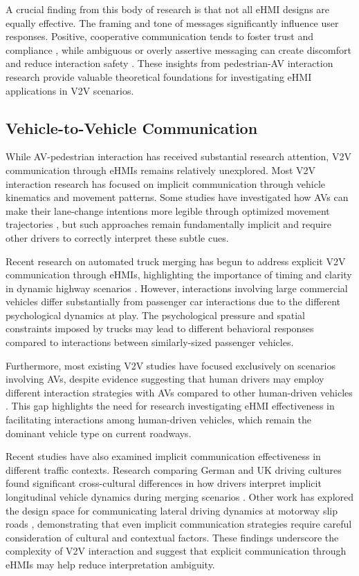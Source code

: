 \documentclass[manuscript,review]{acmart}
\begin{document}
A crucial finding from this body of research is that not all eHMI designs are equally effective. The framing and tone of messages significantly influence user responses. Positive, cooperative communication tends to foster trust and compliance \cite{ackermann2019deceleration, bengler2020hmi, deb2020communicating}, while ambiguous or overly assertive messaging can create discomfort and reduce interaction safety \cite{ames2017interpersonal, she2021shaping}. These insights from pedestrian-AV interaction research provide valuable theoretical foundations for investigating eHMI applications in V2V scenarios.

\subsection{Vehicle-to-Vehicle Communication}

While AV-pedestrian interaction has received substantial research attention, V2V communication through eHMIs remains relatively unexplored. Most V2V interaction research has focused on implicit communication through vehicle kinematics and movement patterns. Some studies have investigated how AVs can make their lane-change intentions more legible through optimized movement trajectories \cite{lee2023coming}, but such approaches remain fundamentally implicit and require other drivers to correctly interpret these subtle cues.

Recent research on automated truck merging has begun to address explicit V2V communication through eHMIs, highlighting the importance of timing and clarity in dynamic highway scenarios \cite{gwak2025encounter}. However, interactions involving large commercial vehicles differ substantially from passenger car interactions due to the different psychological dynamics at play. The psychological pressure and spatial constraints imposed by trucks may lead to different behavioral responses compared to interactions between similarly-sized passenger vehicles.

Furthermore, most existing V2V studies have focused exclusively on scenarios involving AVs, despite evidence suggesting that human drivers may employ different interaction strategies with AVs compared to other human-driven vehicles \cite{huang2022sharing, stanton2020turing}. This gap highlights the need for research investigating eHMI effectiveness in facilitating interactions among human-driven vehicles, which remain the dominant vehicle type on current roadways.

Recent studies have also examined implicit communication effectiveness in different traffic contexts. Research comparing German and UK driving cultures found significant cross-cultural differences in how drivers interpret implicit longitudinal vehicle dynamics during merging scenarios \cite{ehrhardt2024comparing}. Other work has explored the design space for communicating lateral driving dynamics at motorway slip roads \cite{ehrhardt2023evaluation, ehrhardt2023implicit}, demonstrating that even implicit communication strategies require careful consideration of cultural and contextual factors. These findings underscore the complexity of V2V interaction and suggest that explicit communication through eHMIs may help reduce interpretation ambiguity.
\end{document}
